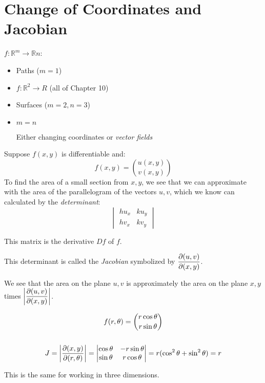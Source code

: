 \documentclass[00_complete]{subfiles}
\begin{document}
\section{Change of Coordinates and Jacobian}
\begin{reminder}
    $f: \mathbb{R}^m \to \mathbb{R}n$:
    \begin{itemize} \tightlist
        \item Paths ($m=1$)
        \item $f: \mathbb{R}^2 \to R$ (all of Chapter 10)
        \item Surfaces ($m=2,n=3$)
        \item $m=n$

            Either changing coordinates or \emph{vector fields}
    \end{itemize}
\end{reminder}
Suppose $f(x,y)$ is differentiable and:
$$f(x,y)=\binom{u(x,y)}{v(x,y)}$$
To find the area of a small section from $x,y$, we see that we can approximate
with the area of the parallelogram of the vectors $u,v$, which we know can
calculated by the \emph{determinant}:
$$\begin{vmatrix}
    hu_x&ku_y \\ hv_x&kv_y
\end{vmatrix}$$
\begin{note}
    This matrix is the derivative $Df$ of $f$.
\end{note}
\begin{definition}[Jacobian]
    This determinant is called the \emph{Jacobian} symbolized by
    $\displaystyle \pdv{(u,v)}{(x,y)}$.
\end{definition}
We see that the area on the plane  $u,v$ is approximately the area on the plane
$x,y$ times $\displaystyle\left|\pdv{(u,v)}{(x,y)}\right|$.
\begin{example}
    \begin{gather*}
    f(r,\theta)=\binom{r\cos \theta}{r\sin\theta} \\ \\
    J = \left|\pdv{(x,y)}{(r,\theta)}\right|=\begin{vmatrix}
        \cos\theta &-r\sin\theta \\
        \sin\theta &r\cos\theta
    \end{vmatrix} = r(\cos^2\theta+\sin^2\theta)=r
    \end{gather*}
\end{example}
\begin{note}
    This is the same for working in three dimensions.
\end{note}
\end{document}
